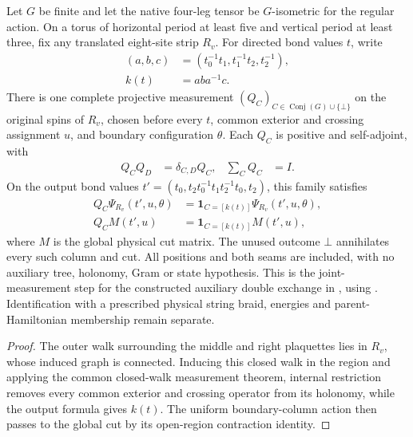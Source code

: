 \begin{lemma}%
    \label{thm:peps_torus_three_plaquette_output_measurement}
    \leanok
    Let $G$ be finite and let the native four-leg tensor be $G$-isometric
    for the regular action. On a torus of horizontal period at least five
    and vertical period at least three, fix any translated eight-site strip
    $R_v$. For directed bond values $t$, write
    \begin{align}
        (a,b,c) & =(t_0^{-1}t_1,t_1^{-1}t_2,t_2^{-1}), \\
        k(t)    & =aba^{-1}c.
    \end{align}
    There is one complete projective measurement
    $(Q_C)_{C\in\operatorname{Conj}(G)\cup\{\bot\}}$ on the original spins
    of $R_v$, chosen before every $t$, common exterior and crossing
    assignment $u$, and boundary configuration $\theta$.
    Each $Q_C$ is positive and self-adjoint, with
    \begin{align}
        Q_CQ_D & =\delta_{C,D}Q_C, & \sum_C Q_C & =I.
    \end{align}
    On the output bond values
    $t'=(t_0,t_2t_0^{-1}t_1t_2^{-1}t_0,t_2)$, this family satisfies
    \begin{align}
        Q_C\Psi_{R_v}(t',u,\theta)
                   & =\mathbf1_{C=[k(t)]}\Psi_{R_v}(t',u,\theta), \\
        Q_CM(t',u) & =\mathbf1_{C=[k(t)]}M(t',u),
    \end{align}
    where $M$ is the global physical cut matrix.
    The unused outcome $\bot$ annihilates every such column and cut.
    All positions and both seams are included, with no auxiliary tree,
    holonomy, Gram or state hypothesis.
    This is the joint-measurement step for the constructed auxiliary
    double exchange in \cite[braiding passage]{Schuch2010PEPS}, using
    \cite[Theorem 6.15]{Schuch2010PEPS}. Identification with a prescribed
    physical string braid, energies and parent-Hamiltonian membership
    remain separate.
\end{lemma}

\begin{proof}\leanok
    The outer walk surrounding the middle and right plaquettes lies
    in $R_v$, whose induced graph is connected. Inducing this closed walk
    in the region and applying the common closed-walk measurement theorem,
    internal restriction removes every common exterior and crossing
    operator from its holonomy, while the output formula gives $k(t)$.
    The uniform boundary-column action then passes to the global cut by its
    open-region contraction identity.
\end{proof}

